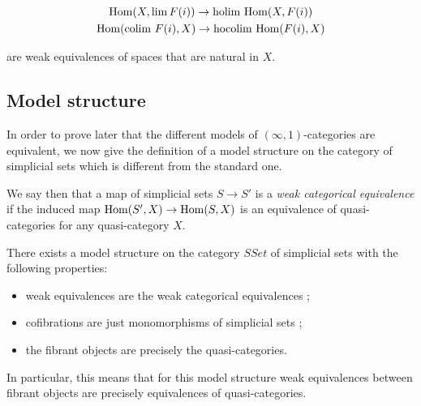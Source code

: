 \begin{refsection}
\begin{gather*}
\mathrm{Hom}(X, \lim F(i)) \to \text{holim }\mathrm{Hom}(X,F(i)) \\
\mathrm{Hom}(\text{colim }F(i),X) \to \text{hocolim } \mathrm{Hom}(F(i),X)
\end{gather*}

are weak equivalences of spaces that are natural in $X$.


\subsection{Model structure}

In order to prove later that the different models of $(\infty,1)$-categories are equivalent, we now give the definition of a model structure on the category of simplicial sets which is different from the standard one.

We say then that a map of simplicial sets $S \to S'$ is a \emph{weak categorical equivalence} if the induced map $\mathrm{Hom}(S',X) \to \mathrm{Hom}(S,X)$ is an equivalence of quasi-categories for any quasi-category $X$.

\begin{thm}[Joyal] There exists a model structure on the category $SSet$ of simplicial sets with the following properties:
\begin{itemize}
\item weak equivalences are the weak categorical equivalences ;
\item cofibrations are just monomorphisms of simplicial sets ;
\item the fibrant objects are precisely the quasi-categories.
\end{itemize}
\end{thm}

In particular, this means that for this model structure weak equivalences between fibrant objects are precisely equivalences of quasi-categories.

\nocite{bergner1}
\printbibliography[heading = local]

\end{refsection}
